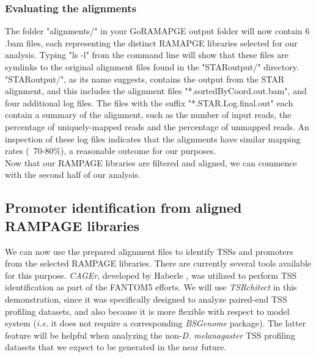 \documentclass[runningheads,a4paper]{llncs}
\begin{document}
\begin{linenumbers}
\begin{itemize}
\subsubsection{Evaluating the alignments}

The folder "alignments/" in your GoRAMAPGE output folder will now contain 6 .bam files, each representing the distinct RAMAPGE libraries selected for our analysis.
Typing "ls -l" from the command line will show that these files are symlinks to the original alignment files found in the "STARoutput/" directory.
"STARoutput/", as its name suggests, contains the output from the STAR alignment, and this includes the alignment files "*.sortedByCoord.out.bam", and four additional log files.
The files with the suffix "*.STAR.Log.final.out" each contain a summary of the alignment, such as the number of input reads, the percentage of uniquely-mapped reads and the percentage of unmapped reads.
An inspection of these log files indicates that the alignments have similar mapping rates (~70-80\%), a reasonable outcome for our purposes.\\

Now that our RAMPAGE libraries are filtered and aligned, we can commence with the second half of our analysis.

\subsection{Promoter identification from aligned RAMPAGE libraries}

We can now use the prepared alignment files to identify TSSs and promoters from the selected RAMPAGE libraries.
There are currently several tools available for this purpose.
\textit{CAGEr}, developed by Haberle \cite{Haberle:6TVSLN3N}, was utilized to perform TSS identification as part of the FANTOM5 efforts.
We will use \textit{TSRchitect} in this demonstration, since it was specifically designed to analyze paired-end TSS profiling datasets, and also because it is more flexible with respect to model system (\textit{i.e.} it does not require a corresponding \textit{BSGenome} package).
The latter feature will be helpful when analyzing the non-\textit{D. melanagaster} TSS profiling datasets that we expect to be generated in the near future.


\end{itemize}
\end{linenumbers}
\end{document}
